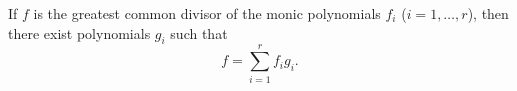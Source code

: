 If $f$ is the greatest common divisor of the monic polynomials $f_i$ ($i = 1, \ldots, r$), then there exist polynomials $g_i$ such that
$$f = \sum_{i=1}^{r} f_i g_i.$$
